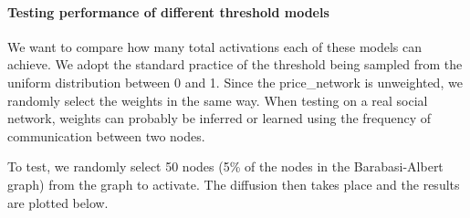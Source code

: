 \documentclass[11pt]{article}
\begin{document}
    \hypertarget{testing-performance-of-different-threshold-models}{%
\paragraph{Testing performance of different threshold
models}\label{testing-performance-of-different-threshold-models}}

We want to compare how many total activations each of these models can
achieve. We adopt the standard practice of the threshold being sampled
from the uniform distribution between 0 and 1. Since the price\_network
is unweighted, we randomly select the weights in the same way. When
testing on a real social network, weights can probably be inferred or
learned using the frequency of communication between two nodes.

To test, we randomly select 50 nodes (5\% of the nodes in the
Barabasi-Albert graph) from the graph to activate. The diffusion then
takes place and the results are plotted below.
\end{document}
